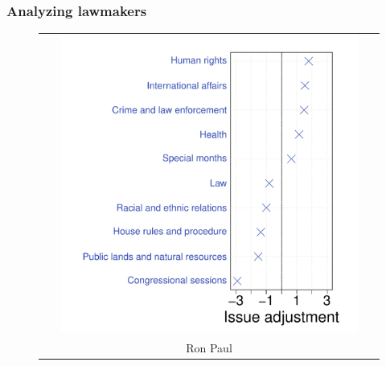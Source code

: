 \subsubsection{Analyzing lawmakers}


\begin{figure}
  \center
  \vspace{-10pt}
    \begin{tabular}{c}
      \includegraphics[width=0.9\textwidth,height=0.7\textwidth]{chapter_spatial_voting_with_text/figures/3393_house_Ronald_Paul_400311.pdf} \\ \Large Ron Paul \\

\end{tabular}
\end{figure}
